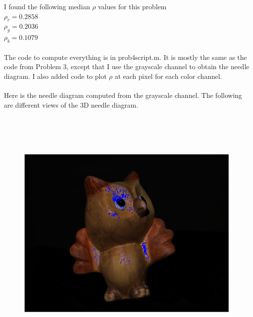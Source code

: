 \documentclass[11pt,psfig]{article}
\begin{document}
I found the following median $\rho$ values for this problem\\
$\rho_r = 0.2858$\\
$\rho_g = 0.2036$\\
$\rho_b = 0.1079$\\
\\
The code to compute everything is in prob4script.m. It is mostly the same as the code from Problem 3, except that I use the grayscale channel to obtain the needle diagram. I also added code to plot $\rho$ at each pixel for each color channel.\\
\\
Here is the needle diagram computed from the grayscale channel. The following are different views of the 3D needle diagram. 
\begin{figure}[H]
\centering
\includegraphics[height=5in]{prob4needlePlot1.png}
\end{figure}
\end{document}
